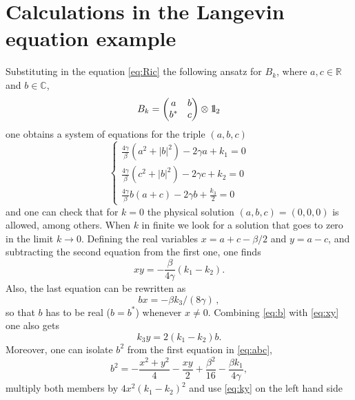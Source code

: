 \documentclass[a4paper,11pt]{article}
\numberwithin{equation}{section}
\newcommand{\bbbone}{\mathchoice {\rm 1\mskip-4mu l} {\rm 1\mskip-4mu l}
{\rm 1\mskip-4.5mu l} {\rm 1\mskip-5mu l}}
\begin{document}
\section{Calculations in the Langevin equation example}
\label{app_langevin}

Substituting in the equation \eqref{eq:Ric} the following ansatz for $B_k$, where $a,c \in \mathbb{R}$ and $b \in \mathbb{C}$,
\begin{equation*}
    B_k = 
    \begin{pmatrix}
        a & b \\
        b^* & c
    \end{pmatrix} \otimes \bbbone_2
\end{equation*}
one obtains a system of equations for the triple $(a,b,c)$
\begin{equation}\label{eq:abc}
   \begin{cases}
       \frac{4\gamma}{\beta} (a^2 + |b|^2) -2\gamma a + k_1 =0 \\
       \frac{4\gamma}{\beta} (c^2 + |b|^2) -2\gamma c + k_2 =0 \\
       \frac{4\gamma}{\beta} b (a + c) -2\gamma b + \frac{k_3}{2} =0
   \end{cases} 
\end{equation}
and one can check that for $k=0$ the physical solution $(a,b,c)=(0,0,0)$ is allowed, among others. When $k$ in finite we look for a solution that goes to zero in the limit $k \to 0$. Defining the real variables $x= a+c -\beta/2$ and $y= a-c$, and subtracting the second equation from the first one, one finds
\begin{equation}\label{eq:xy}
    xy = - \frac{\beta}{4\gamma} (k_1 - k_2).
\end{equation}
Also, the last equation can be rewritten as
\begin{equation}\label{eq:b}
bx=- \beta k_3/(8\gamma)  \,,
\end{equation}
so that $b$ has to be real ($b=b^*$) whenever $x\neq 0$.
Combining \eqref{eq:b} with \eqref{eq:xy} one also gets
\begin{equation}\label{eq:ky}
    k_3 y = 2 (k_1 -k_2) b .
\end{equation}
Moreover, one can isolate $b^2$ from the first equation in \eqref{eq:abc}, 
\begin{equation*}
    b^2 = - \frac{x^2 + y^2}{4} -\frac{xy}{2} +\frac{\beta^2}{16} - \frac{\beta k_1}{4\gamma} ,
\end{equation*}
multiply both members by $4 x^2 (k_1 - k_2)^2$ and use \eqref{eq:ky} on the left hand side
\end{document}
